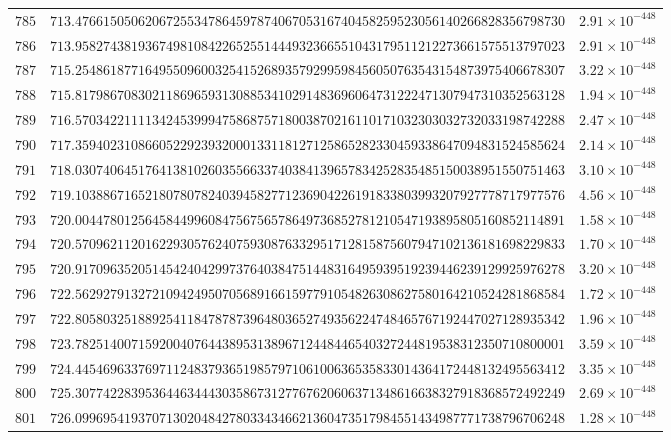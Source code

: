 \documentclass[12pt,reqno]{amsart}
\theoremstyle{remark}
\begin{document}
\begin{longtable}{clc}
$785$ & $713.4766150506206725534786459787406705316740458259523056140266828356798730$ & $2.91\times 10^{-448}$ \\
$786$ & $713.9582743819367498108422652551444932366551043179511212273661575513797023$ & $2.91\times 10^{-448}$ \\
$787$ & $715.2548618771649550960032541526893579299598456050763543154873975406678307$ & $3.22\times 10^{-448}$ \\
$788$ & $715.8179867083021186965931308853410291483696064731222471307947310352563128$ & $1.94\times 10^{-448}$ \\
$789$ & $716.5703422111134245399947586875718003870216110171032303032732033198742288$ & $2.47\times 10^{-448}$ \\
$790$ & $717.3594023108660522923932000133118127125865282330459338647094831524585624$ & $2.14\times 10^{-448}$ \\
$791$ & $718.0307406451764138102603556633740384139657834252835485150038951550751463$ & $3.10\times 10^{-448}$ \\
$792$ & $719.1038867165218078078240394582771236904226191833803993207927778717977576$ & $4.56\times 10^{-448}$ \\
$793$ & $720.0044780125645844996084756756578649736852781210547193895805160852114891$ & $1.58\times 10^{-448}$ \\
$794$ & $720.5709621120162293057624075930876332951712815875607947102136181698229833$ & $1.70\times 10^{-448}$ \\
$795$ & $720.9170963520514542404299737640384751448316495939519239446239129925976278$ & $3.20\times 10^{-448}$ \\
$796$ & $722.5629279132721094249507056891661597791054826308627580164210524281868584$ & $1.72\times 10^{-448}$ \\
$797$ & $722.8058032518892541184787873964803652749356224748465767192447027128935342$ & $1.96\times 10^{-448}$ \\
$798$ & $723.7825140071592004076443895313896712448446540327244819538312350710800001$ & $3.59\times 10^{-448}$ \\
$799$ & $724.4454696337697112483793651985797106100636535833014364172448132495563412$ & $3.35\times 10^{-448}$ \\
$800$ & $725.3077422839536446344430358673127767620606371348616638327918368572492249$ & $2.69\times 10^{-448}$ \\
$801$ & $726.0996954193707130204842780334346621360473517984551434987771738796706248$ & $1.28\times 10^{-448}$ \\

\end{longtable}
\end{document}
